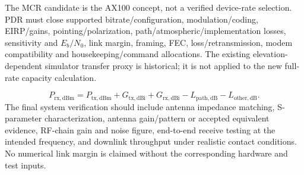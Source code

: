 The MCR candidate is the AX100 concept, not a verified device-rate selection. PDR must close supported bitrate/configuration, modulation/coding, EIRP/gains, pointing/polarization, path/atmospheric/implementation losses, sensitivity and $E_b/N_0$, link margin, framing, FEC, loss/retransmission, modem compatibility and housekeeping/command allocations. The existing elevation-dependent simulator transfer proxy is historical; it is not applied to the new full-rate capacity calculation.



\begin{equation}\label{eq:rf-link-budget}P_{\mathrm{rx,dBm}}=P_{\mathrm{tx,dBm}}+G_{\mathrm{tx,dBi}}+G_{\mathrm{rx,dBi}}-L_{\mathrm{path,dB}}-L_{\mathrm{other,dB}}.\end{equation}
The final system verification should include antenna impedance matching, S-parameter characterization, antenna gain/pattern or accepted equivalent evidence, RF-chain gain and noise figure, end-to-end receive testing at the intended frequency, and downlink throughput under realistic contact conditions. No numerical link margin is claimed without the corresponding hardware and test inputs.
